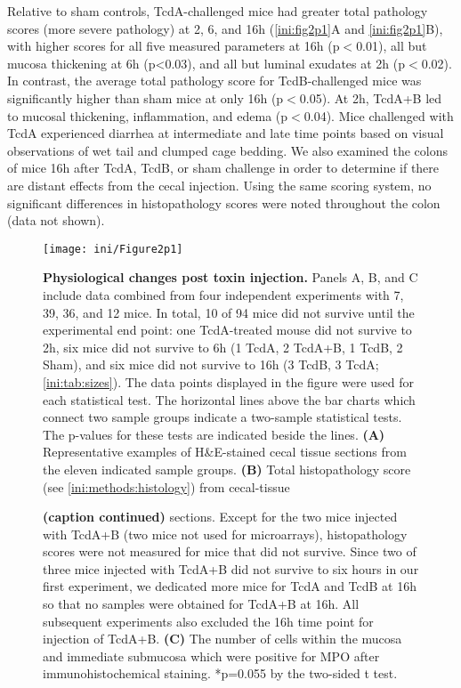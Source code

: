 Relative to sham controls, TcdA-challenged mice had greater total 
pathology scores (more severe pathology) at 2, 6, and 16h (\autoref{ini:fig2p1}A 
and \autoref{ini:fig2p1}B), with higher scores for all five measured 
parameters at 16h (p$<$0.01), all but mucosa thickening at 6h (p<0.03), 
and all but luminal exudates at 2h (p$<$0.02). In contrast, the average 
total pathology score for TcdB-challenged mice was significantly 
higher than sham mice at only 16h (p$<$0.05). At 2h, TcdA+B led to 
mucosal thickening, inflammation, and edema (p$<$0.04). Mice challenged 
with TcdA experienced diarrhea at intermediate and late time points 
based on visual observations of wet tail and clumped cage bedding. We 
also examined the colons of mice 16h after TcdA, TcdB, or sham challenge 
in order to determine if there are distant effects from the cecal injection. 
Using the same scoring system, no significant differences in 
histopathology scores were noted throughout the colon (data not shown).

\begin{figure}
  \centering
  \texttt{[image: ini/Figure2p1]}
  \caption[Physiological and gene expression changes post toxin injection]{
       \textbf{Physiological changes post toxin injection.}
       Panels A, B, and C include data combined from four independent experiments 
       with 7, 39, 36, and 12 mice. In total, 10 of 94 mice did not survive until 
       the experimental end point: one TcdA-treated mouse did not survive to 2h, 
       six mice did not survive to 6h (1 TcdA, 2 TcdA+B, 1 TcdB, 2 Sham), and 
       six mice did not survive to 16h (3 TcdB, 3 TcdA; \autoref{ini:tab:sizes}). 
       The data points displayed in the figure were used for each statistical 
       test. The horizontal lines above the bar charts which connect two sample 
       groups indicate a two-sample statistical tests. The p-values for these 
       tests are indicated beside the lines. \textbf{(A)} Representative 
       examples of H\&{}E-stained cecal tissue sections from the eleven 
       indicated sample groups. \textbf{(B)} Total histopathology score 
       (see \ref{ini:methods:histology}) from cecal-tissue       
  }
  \label{ini:fig2p1}
\end{figure}
\begin{figure} [t!]
  \caption*{ \textbf{(caption continued)} sections. Except 
       for the two mice injected with TcdA+B (two mice not used for microarrays), 
       histopathology scores were not measured for mice that did not survive. 
       Since two of three mice injected with TcdA+B did not survive to six 
       hours in our first experiment, we dedicated more mice for TcdA and 
       TcdB at 16h so that no samples were obtained for TcdA+B at 16h. All 
       subsequent experiments also excluded the 16h time point for injection 
       of TcdA+B.
  \textbf{(C)} The number of cells within the mucosa and 
        immediate submucosa which were positive for MPO after immunohistochemical 
        staining. *p=0.055 by the two-sided t test.}
\end{figure}

